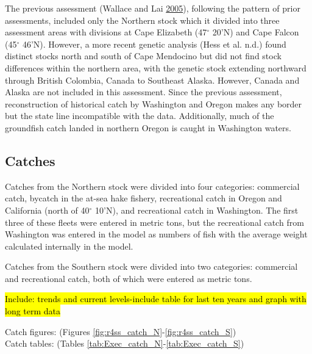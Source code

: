 \documentclass[12pt,]{article}
\begin{document}
The previous assessment (Wallace and Lai
\protect\hyperlink{ref-Wallace2005}{2005}), following the pattern of
prior assessments, included only the Northern stock which it divided
into three assessment areas with divisions at Cape Elizabeth
(47\(^\circ\) 20'N) and Cape Falcon (45\(^\circ\) 46'N). However, a more
recent genetic analysis (Hess et al. n.d.) found distinct stocks north
and south of Cape Mendocino but did not find stock differences within
the northern area, with the genetic stock extending northward through
British Colombia, Canada to Southeast Alaska. However, Canada and Alaska
are not included in this assessment. Since the previous assessment,
reconstruction of historical catch by Washington and Oregon makes any
border but the state line incompatible with the data. Additionally, much
of the groundfish catch landed in northern Oregon is caught in
Washington waters.

\subsection*{Catches}\label{catches}

Catches from the Northern stock were divided into four categories:
commercial catch, bycatch in the at-sea hake fishery, recreational catch
in Oregon and California (north of 40\(^\circ\) 10'N), and recreational
catch in Washington. The first three of these fleets were entered in
metric tons, but the recreational catch from Washington was entered in
the model as numbers of fish with the average weight calculated
internally in the model.

Catches from the Southern stock were divided into two categories:
commercial and recreational catch, both of which were entered as metric
tons.

\hl{Include: trends and current levels-include table for last ten years and graph with 
long term data}

Catch figures: (Figures \ref{fig:r4ss_catch_N}-\ref{fig:r4ss_catch_S})\\
Catch tables: (Tables \ref{tab:Exec_catch_N}-\ref{tab:Exec_catch_S})

\FloatBarrier

\FloatBarrier
\end{document}
